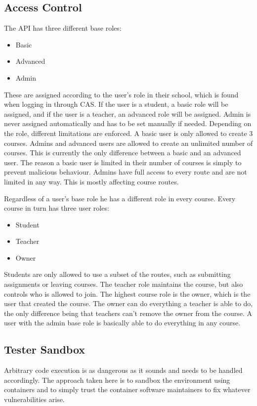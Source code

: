 \subsection{Access Control}
The API has three different base roles:
\begin{itemize}
\item Basic
\item Advanced
\item Admin
\end{itemize}
These are assigned according to the user's role in their school, which is found when logging in through CAS. If the user is a student, a basic role will be assigned, and if the user is a teacher, an advanced role will be assigned. Admin is never assigned automatically and has to be set manually if needed. Depending on the role, different limitations are enforced. A basic user is only allowed to create 3 courses. Admins and advanced users are allowed to create an unlimited number of courses. This is currently the only difference between a basic and an advanced user. The reason a basic user is limited in their number of courses is simply to prevent malicious behaviour. Admins have full access to every route and are not limited in any way. This is mostly affecting course routes.

Regardless of a user's base role he has a different role in every course. Every course in turn has three user roles:
\begin{itemize}
\item Student
\item Teacher
\item Owner
\end{itemize}
Students are only allowed to use a subset of the routes, such as submitting assignments or leaving courses. The teacher role maintains the course, but also controls who is allowed to join. The highest course role is the owner, which is the user that created the course. The owner can do everything a teacher is able to do, the only difference being that teachers can't remove the owner from the course. A user with the admin base role is basically able to do everything in any course.

\subsection{Tester Sandbox}
Arbitrary code execution is as dangerous as it sounds and needs to be handled accordingly. The approach taken here is to sandbox the environment using containers and to simply trust the container software maintainers to fix whatever vulnerabilities arise.

